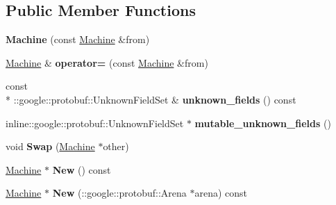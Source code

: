 \subsection*{Public Member Functions}
\begin{DoxyCompactItemize}
\item 
\hypertarget{classmachines_1_1Machine_a4bc25165182e6a979ef514463749076e}{{\bfseries Machine} (const \hyperlink{classmachines_1_1Machine}{Machine} \&from)}\label{classmachines_1_1Machine_a4bc25165182e6a979ef514463749076e}

\item 
\hypertarget{classmachines_1_1Machine_a446fbdac340914a6706dfe3251d7e9f7}{\hyperlink{classmachines_1_1Machine}{Machine} \& {\bfseries operator=} (const \hyperlink{classmachines_1_1Machine}{Machine} \&from)}\label{classmachines_1_1Machine_a446fbdac340914a6706dfe3251d7e9f7}

\item 
\hypertarget{classmachines_1_1Machine_a253de277819734acf7ddc3669626fe0c}{const \\*
\-::google\-::protobuf\-::\-Unknown\-Field\-Set \& {\bfseries unknown\-\_\-fields} () const }\label{classmachines_1_1Machine_a253de277819734acf7ddc3669626fe0c}

\item 
\hypertarget{classmachines_1_1Machine_aa44fa140cc57ec8ce33d85d77444570a}{inline\-::google\-::protobuf\-::\-Unknown\-Field\-Set $\ast$ {\bfseries mutable\-\_\-unknown\-\_\-fields} ()}\label{classmachines_1_1Machine_aa44fa140cc57ec8ce33d85d77444570a}

\item 
\hypertarget{classmachines_1_1Machine_aa4faae554cfeeb3c4e247822e203186d}{void {\bfseries Swap} (\hyperlink{classmachines_1_1Machine}{Machine} $\ast$other)}\label{classmachines_1_1Machine_aa4faae554cfeeb3c4e247822e203186d}

\item 
\hypertarget{classmachines_1_1Machine_ae21b376d3ca27fb1998a640cf3c5b466}{\hyperlink{classmachines_1_1Machine}{Machine} $\ast$ {\bfseries New} () const }\label{classmachines_1_1Machine_ae21b376d3ca27fb1998a640cf3c5b466}

\item 
\hypertarget{classmachines_1_1Machine_ac68514d217a1622798bb41a662b9cf41}{\hyperlink{classmachines_1_1Machine}{Machine} $\ast$ {\bfseries New} (\-::google\-::protobuf\-::\-Arena $\ast$arena) const }\label{classmachines_1_1Machine_ac68514d217a1622798bb41a662b9cf41}


\end{DoxyCompactItemize}
